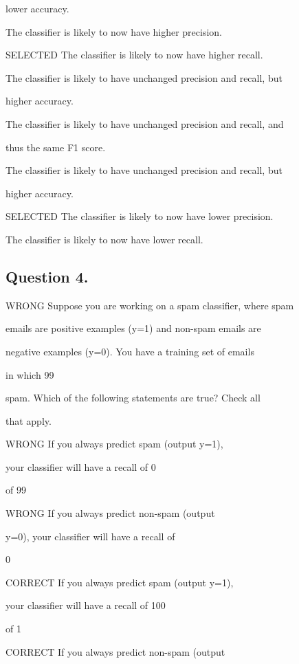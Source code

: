 \documentclass[11pt]{article} %
\begin{document}
lower accuracy.

The classifier is likely to now have higher precision.

SELECTED The classifier is likely to now have higher recall.

The classifier is likely to have unchanged precision and recall, but

higher accuracy.


The classifier is likely to have unchanged precision and recall, and

thus the same F1 score.

The classifier is likely to have unchanged precision and recall, but

higher accuracy.


SELECTED The classifier is likely to now have lower precision.

The classifier is likely to now have lower recall.
\subsection*{Question 4.} WRONG
Suppose you are working on a spam classifier, where spam

emails are positive examples (y=1) and non-spam emails are

negative examples (y=0). You have a training set of emails

in which 99%

spam. Which of the following statements are true? Check all

that apply.


WRONG If you always predict spam (output y=1),

your classifier will have a recall of 0%

of 99%


WRONG If you always predict non-spam (output

y=0), your classifier will have a recall of

0%


CORRECT If you always predict spam (output y=1),

your classifier will have a recall of 100%

of 1%



CORRECT If you always predict non-spam (output
\end{document}
